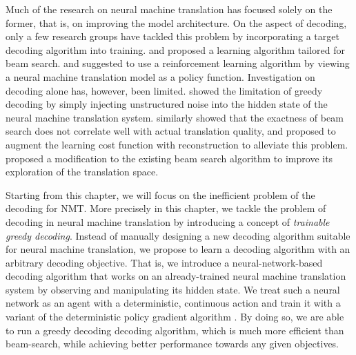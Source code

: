 Much of the research on neural machine translation has focused solely on the former, that is, on improving the model architecture. 
On the aspect of decoding, only a few research groups have tackled this problem by incorporating a target decoding algorithm into training. \citet{wiseman2016sequence} and \citet{shen2015minimum} proposed a learning algorithm tailored for beam search. \citet{ranzato2015sequence} and \cite{bahdanau2016actor} suggested to use a reinforcement learning algorithm by viewing a neural machine translation model as a policy function.
Investigation on decoding alone has, however, been limited. \citet{cho2016noisy} showed the limitation of greedy decoding by simply injecting unstructured noise into the hidden state of the neural machine translation system. \citet{tu2016neural} similarly showed that the exactness of beam search does not correlate well with actual translation quality, and proposed to augment the learning cost function with reconstruction to alleviate this problem. \citet{li2016simple} proposed a modification to the existing beam search algorithm to improve its exploration of the translation space. 

Starting from this chapter, we will focus on the inefficient problem of the decoding for NMT. More precisely in this chapter,
we tackle the problem of decoding in neural machine translation by introducing a concept of {\it trainable greedy decoding}. Instead of manually designing a new decoding algorithm suitable for neural machine translation, we propose to learn a decoding algorithm with an arbitrary decoding objective. That is, we introduce a neural-network-based decoding algorithm that works on an already-trained neural machine translation system by observing and manipulating its hidden state. We treat such a neural network as an agent with a deterministic, continuous action and train it with a variant of the deterministic policy gradient algorithm \citep{silver2014deterministic}.  By doing so, we are able to run a greedy decoding decoding algorithm, which is much more efficient than beam-search, while achieving better performance towards any given objectives. %

